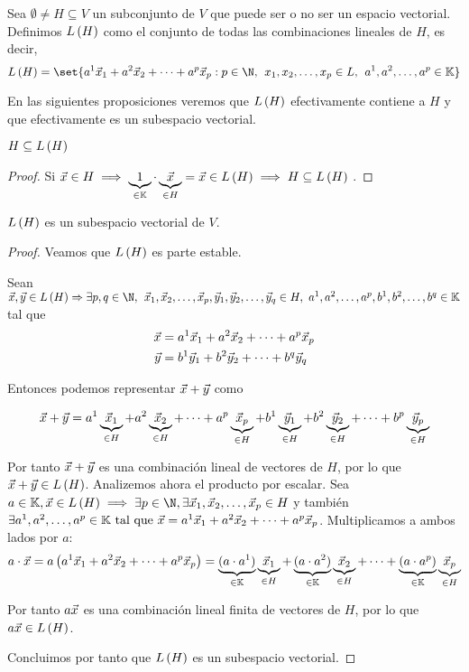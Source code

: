 \documentclass[../algebra_lineal.tex]{subfiles}
\begin{document}
\begin{definition}
    Sea $\emptyset \neq H \subseteq V$ un subconjunto de $V$ que puede ser o no ser un espacio vectorial. Definimos $L\left(H\right)$ como el conjunto de todas las combinaciones lineales de $H$, es decir,
    \[
        \lspan{H} = \set{\lincomb{a}{x}{p} : p \in \N, \spc \dlst{x}{p} \in L, \spc \ulst{a}{p} \in \K}
    \]
\end{definition}

En las siguientes proposiciones veremos que $L\left(H\right)$ efectivamente contiene a $H$ y que efectivamente es un subespacio vectorial.

\begin{proposition}
    $H \subseteq L\left(H\right)$
\end{proposition}

\begin{proof}
    Si $\vec{x} \in H \implies \underbrace{1}_{\in \mathbb{K}} \cdot \underbrace{\vec{x}}_{\in H} = \vec{x} \in L\left(H\right) \implies H \subseteq L\left(H\right)$
    $ $.
\end{proof}

\begin{proposition}
    $L\left(H\right)$ es un subespacio vectorial de $V$.
\end{proposition}

\begin{proof}
    Veamos que $L\left(H\right)$ es parte estable.

    Sean $\vx, \vy \in \lspan{H} \Rightarrow \exists p, q \in \N, \spc \dlst{\vx}{p}, \dlst{\vy}{q} \in H, \, \, \ulst{a}{p}, \ulst{b}{q} \in \K $
    tal que 
    \begin{align*}
        \vec{x} &= {a}^{1}\vec{x}_{1}+{a}^{2}\vec{x}_{2}+\dots+{a}^{p}\vec{x}_{p} \\
        \vec{y} &= {b}^{1}\vec{y}_{1}+{b}^{2}\vec{y}_{2}+\dots+{b}^{q}\vec{y}_{q}
    \end{align*}

    Entonces podemos representar $\vec{x} + \vec{y}$ como
    
    \[
        \vec{x} + \vec{y} = a^1\underbrace{\vec{x}_1}_{\in H}+a^2\underbrace{\vec{x}_2}_{\in H}+\dots+a^p\underbrace{\vec{x}_p}_{\in H} + b^1\underbrace{\vec{y}_1}_{\in H}+b^2\underbrace{\vec{y}_2}_{\in H}+\dots+b^p\underbrace{\vec{y}_p}_{\in H}
    \]

    Por tanto $\vec{x} + \vec{y}$ es una combinación lineal de vectores de $H$, por lo que $\vec{x} + \vec{y} \in L\left(H\right)$. Analizemos ahora el producto por escalar. Sea $a \in \K, \vx \in \lspan{H} \implies \exists p \in \N, \space \exists \dlst{\vx}{p} \in H$ y también $\exists {a}^{1}, {a}^{2}, \dots, {a}^{p} \in \mathbb{K} \mathrm{\,\, tal \,\, que \,\,} \vec{x} = {a}^{1}\vec{x}_{1}+{a}^{2}\vec{x}_{2}+\dots+{a}^{p}\vec{x}_{p}$.  Multiplicamos a ambos lados por $a$:
    \[a\cdot \vec{x} = a \left( {a}^{1}\vec{x}_{1}+{a}^{2}\vec{x}_{2}+\dots+{a}^{p}\vec{x}_{p} \right) = \underbrace{(a \cdot a^1)}_{\in \mathbb{K}}\underbrace{\vec{x}_1}_{\in H} + \underbrace{(a \cdot a^2)}_{\in \mathbb{K}}\underbrace{\vec{x}_2}_{\in H} + \dots + \underbrace{(a \cdot a^p)}_{\in \mathbb{K}}\underbrace{\vec{x}_p}_{\in H}\]

    Por tanto $a\vec{x}$ es una combinación lineal finita de vectores de $H$, por lo que $a\vec{x} \in L\left(H\right)$.

    Concluimos por tanto que $L\left(H\right)$ es un subespacio vectorial.
\end{proof}
\end{document}
